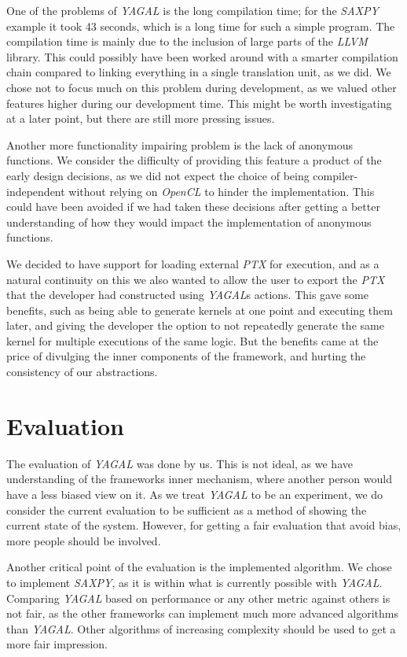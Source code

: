 One of the problems of \textit{YAGAL} is the long compilation time; for the \textit{SAXPY} example it took 43 seconds, which is a long time for such a simple program. The compilation time is mainly due to the inclusion of large parts of the \textit{LLVM} library. This could possibly have been worked around with a smarter compilation chain compared to linking everything in a single translation unit, as we did. We chose not to focus much on this problem during development, as we valued other features higher during our development time. This might be worth investigating at a later point, but there are still more pressing issues.

Another more functionality impairing problem is the lack of anonymous functions. We consider the difficulty of providing this feature a product of the early design decisions, as we did not expect the choice of being compiler-independent without relying on \textit{OpenCL} to hinder the implementation. This could have been avoided if we had taken these decisions after getting a better understanding of how they would impact the implementation of anonymous functions.

We decided to have support for loading external \textit{PTX} for execution, and as a natural continuity on this we also wanted to allow the user to export the \textit{PTX} that the developer had constructed using \textit{YAGAL}s actions. This gave some benefits, such as being able to generate kernels at one point and executing them later, and giving the developer the option to not repeatedly generate the same kernel for multiple executions of the same logic. But the benefits came at the price of divulging the inner components of the framework, and hurting the consistency of our abstractions.

\section{Evaluation}
The evaluation of \textit{YAGAL} was done by us. This is not ideal, as we have understanding of the frameworks inner mechanism, where another person would have a less biased view on it. As we treat \textit{YAGAL} to be an experiment, we do consider the current evaluation to be sufficient as a method of showing the current state of the system. However, for getting a fair evaluation that avoid bias, more people should be involved.

Another critical point of the evaluation is the implemented algorithm. We chose to implement \textit{SAXPY}, as it is within what is currently possible with \textit{YAGAL}. Comparing \textit{YAGAL} based on performance or any other metric against others is not fair, as the other frameworks can implement much more advanced algorithms than \textit{YAGAL}. Other algorithms of increasing complexity should be used to get a more fair impression.

